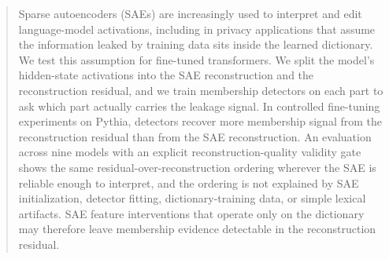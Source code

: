 \documentclass{article}
\theoremstyle{plain}
\theoremstyle{definition}
\theoremstyle{remark}
\begin{document}

\printAffiliationsAndNotice{}  %

\begin{abstract}
Sparse autoencoders (SAEs) are increasingly used to interpret and edit language-model activations, including in privacy applications that assume the information leaked by training data sits inside the learned dictionary. We test this assumption for fine-tuned transformers. We split the model's hidden-state activations into the SAE reconstruction and the reconstruction residual, and we train membership detectors on each part to ask which part actually carries the leakage signal. In controlled fine-tuning experiments on Pythia, detectors recover more membership signal from the reconstruction residual than from the SAE reconstruction. An evaluation across nine models with an explicit reconstruction-quality validity gate shows the same residual-over-reconstruction ordering wherever the SAE is reliable enough to interpret, and the ordering is not explained by SAE initialization, detector fitting, dictionary-training data, or simple lexical artifacts. SAE feature interventions that operate only on the dictionary may therefore leave membership evidence detectable in the reconstruction residual.
\end{abstract}
\end{document}
